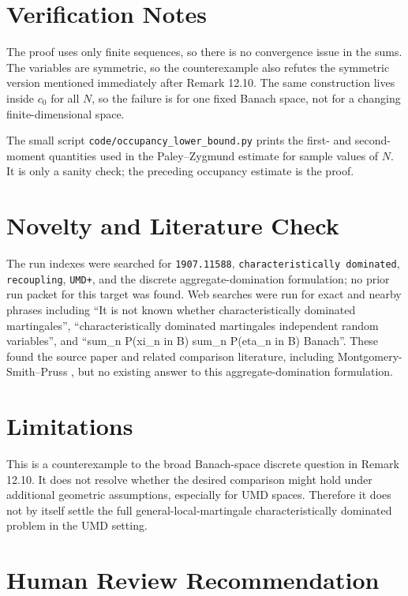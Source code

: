 \documentclass[11pt]{article}
\begin{document}
\section*{Verification Notes}

The proof uses only finite sequences, so there is no convergence issue in the
sums.  The variables are symmetric, so the counterexample also refutes the
symmetric version mentioned immediately after Remark 12.10.  The same
construction lives inside \(c_0\) for all \(N\), so the failure is for one fixed
Banach space, not for a changing finite-dimensional space.

The small script \texttt{code/occupancy\_lower\_bound.py} prints the first- and
second-moment quantities used in the Paley--Zygmund estimate for sample values
of \(N\).  It is only a sanity check; the preceding occupancy estimate is the
proof.

\section*{Novelty and Literature Check}

The run indexes were searched for \texttt{1907.11588},
\texttt{characteristically dominated}, \texttt{recoupling},
\texttt{UMD+}, and the discrete aggregate-domination formulation; no prior run
packet for this target was found.  Web searches were run for exact and nearby
phrases including ``It is not known whether characteristically dominated
martingales'', ``characteristically dominated martingales independent random
variables'', and ``sum\_n P(xi\_n in B) sum\_n P(eta\_n in B) Banach''.  These
found the source paper and related comparison literature, including
Montgomery-Smith--Pruss \cite{MontgomerySmithPruss2001}, but no existing answer
to this aggregate-domination formulation.

\section*{Limitations}

This is a counterexample to the broad Banach-space discrete question in Remark
12.10.  It does not resolve whether the desired comparison might hold under
additional geometric assumptions, especially for UMD spaces.  Therefore it does
not by itself settle the full general-local-martingale characteristically
dominated problem in the UMD setting.

\section*{Human Review Recommendation}
\end{document}
